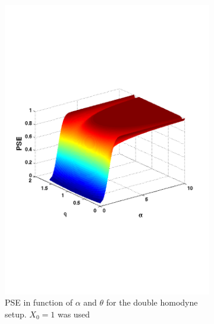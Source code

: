 \documentclass[a4paper]{article}
\begin{document}
\begin{figure}[h]
\centering
\begin{subfigure}{.48\linewidth}
\includegraphics[width=\linewidth, trim= 0mm 60mm 0mm 70mm]{doublehomodynePSE.pdf}
\caption{PSE in function of $\alpha$ and $\theta$ for the double homodyne setup. $X_0=1$ was used}
\end{subfigure}
~
\begin{subfigure}{.48\linewidth}

\end{subfigure}
\end{figure}
\end{document}
